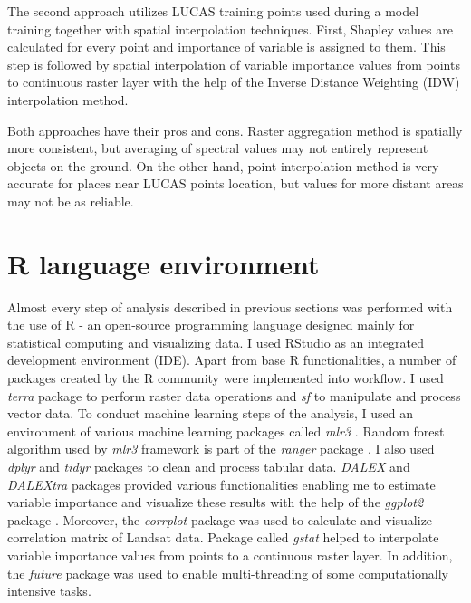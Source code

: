 \documentclass{amuthesis}
\begin{document}
The second approach utilizes LUCAS training points used during a model
training together with spatial interpolation techniques. First, Shapley
values are calculated for every point and importance of variable is
assigned to them. This step is followed by spatial interpolation of
variable importance values from points to continuous raster layer with
the help of the Inverse Distance Weighting (IDW) interpolation method.

Both approaches have their pros and cons. Raster aggregation method is
spatially more consistent, but averaging of spectral values may not
entirely represent objects on the ground. On the other hand, point
interpolation method is very accurate for places near LUCAS points
location, but values for more distant areas may not be as reliable.

\hypertarget{sec-r}{%
\section{R language environment}\label{sec-r}}

Almost every step of analysis described in previous sections was
performed with the use of R \autocite{R-base} - an open-source
programming language designed mainly for statistical computing and
visualizing data. I used RStudio \autocite{rstudio_team_rstudio_2020} as
an integrated development environment (IDE). Apart from base R
functionalities, a number of packages created by the R community were
implemented into workflow. I used \emph{terra} package
\autocite{R-terra} to perform raster data operations and \emph{sf}
\autocite{R-sf} to manipulate and process vector data. To conduct
machine learning steps of the analysis, I used an environment of various
machine learning packages called \emph{mlr3} \autocite{R-mlr3}. Random
forest algorithm used by \emph{mlr3} framework is part of the
\emph{ranger} package \autocite{R-ranger}. I also used \emph{dplyr}
\autocite{R-dplyr} and \emph{tidyr} packages \autocite{R-tidyr} to clean
and process tabular data. \emph{DALEX} \autocite{R-DALEX} and
\emph{DALEXtra} \autocite{R-DALEXtra} packages provided various
functionalities enabling me to estimate variable importance and
visualize these results with the help of the \emph{ggplot2} package
\autocite{R-ggplot2}. Moreover, the \emph{corrplot} package was used to
calculate and visualize correlation matrix of Landsat data. Package
called \emph{gstat} \autocite{R-gstat} helped to interpolate variable
importance values from points to a continuous raster layer. In addition,
the \emph{future} package \autocite{R-future} was used to enable
multi-threading of some computationally intensive tasks.
\end{document}
